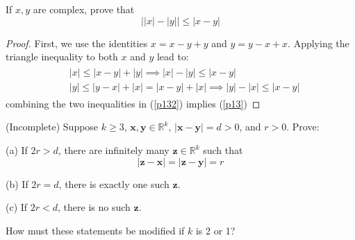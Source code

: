 \documentclass[12pt]{article}
\newenvironment{problem}[2][Problem]{\begin{trivlist}
\item[\hskip \labelsep {\bfseries #1}\hskip \labelsep {\bfseries #2.}]}{\end{trivlist}}
\begin{document}
\begin{problem}{9}

\end{problem}
\begin{problem}{10}

\end{problem}
\begin{problem}{11}

\end{problem}
\begin{problem}{12}

\end{problem}
\begin{problem}{13}
If $x,y$ are complex, prove that
\begin{equation}\label{p13}
\bigl||x| - |y|\bigr| \leq |x - y|
\end{equation}
\begin{proof}
First, we use the identities $x = x - y + y$ and $y = y - x + x$.  Applying the triangle inequality to both $x$ and $y$ lead to:
\begin{align}\label{p132}
\begin{split}
&|x| \leq |x - y| + |y| \implies |x| - |y| \leq |x-y| \\
&|y| \leq |y - x| + |x| = |x - y| + |x| \implies |y| - |x| \leq |x-y|
\end{split}
\end{align}
combining the two inequalities in (\ref{p132}) implies (\ref{p13})
\end{proof}
\end{problem}
\begin{problem}{14}

\end{problem}
\begin{problem}{15}

\end{problem}
\begin{problem}{16}
(Incomplete) Suppose $k \geq 3$, $\mathbf{x},\mathbf{y} \in \mathbb{R}^k$, $|\mathbf{x}-\mathbf{y}| = d > 0$, and $r > 0$.  Prove:

(a) If $2r > d$, there are infinitely many $\mathbf{z}\in \mathbb{R}^k$ such that
\begin{equation}
|\mathbf{z} - \mathbf{x}| = |\mathbf{z} - \mathbf{y}| = r
\end{equation}

(b) If $2r = d$, there is exactly one such $\mathbf{z}$.

(c) If $2r < d$, there is no such $\mathbf{z}$.

How must these statements be modified if $k$ is 2 or 1?
\end{problem}
\end{document}
